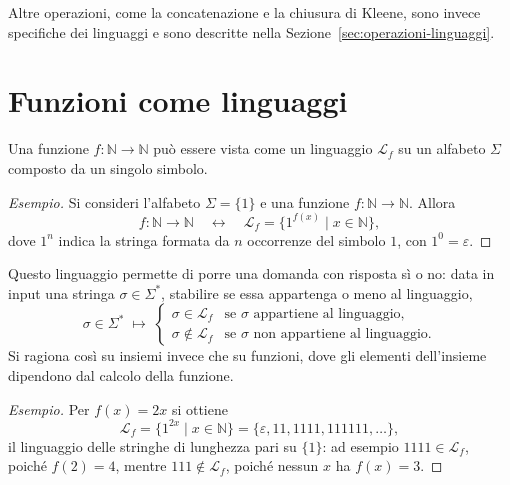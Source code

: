 \documentclass[a4paper, 11pt, oneside]{book}
\theoremstyle{formale}
\newenvironment{esempio}
    {\begin{proof}[\textit{Esempio}]\renewcommand{\qedsymbol}{$\diamond$}}
    {\end{proof}}
\begin{document}
    Altre operazioni, come la concatenazione e la chiusura di Kleene, sono invece
    specifiche dei linguaggi e sono descritte nella Sezione~\ref{sec:operazioni-linguaggi}.

    \section{Funzioni come linguaggi}
    \label{sec:funzioni-linguaggi}
    Una funzione $f \colon \mathbb{N} \to \mathbb{N}$ pu\`o essere vista come un linguaggio
    $\mathcal{L}_f$ su un alfabeto $\Sigma$ composto da un singolo simbolo.

    \begin{esempio}
        Si consideri l'alfabeto $\Sigma = \{1\}$ e una funzione
        $f \colon \mathbb{N} \to \mathbb{N}$. Allora
        \begin{equation*}
            f \colon \mathbb{N} \to \mathbb{N}
            \quad\longleftrightarrow\quad
            \mathcal{L}_f = \{1^{f(x)} \mid x \in \mathbb{N}\},
        \end{equation*}
        dove $1^n$ indica la stringa formata da $n$ occorrenze del simbolo $1$, con
        $1^0 = \varepsilon$.
    \end{esempio}

    Questo linguaggio permette di porre una domanda con risposta s\`i o no: data in input
    una stringa $\sigma \in \Sigma^*$, stabilire se essa appartenga o meno al linguaggio,
    \begin{equation*}
        \sigma \in \Sigma^*
        \;\longmapsto\;
        \begin{cases}
            \sigma \in \mathcal{L}_f & \text{se $\sigma$ appartiene al linguaggio,} \\
            \sigma \notin \mathcal{L}_f & \text{se $\sigma$ non appartiene al linguaggio.}
        \end{cases}
    \end{equation*}
    Si ragiona cos\`i su insiemi invece che su funzioni, dove gli elementi dell'insieme
    dipendono dal calcolo della funzione.

    \begin{esempio}
        Per $f(x) = 2x$ si ottiene
        \begin{equation*}
            \mathcal{L}_f = \{1^{2x} \mid x \in \mathbb{N}\}
            = \{\varepsilon, 11, 1111, 111111, \dots\},
        \end{equation*}
        il linguaggio delle stringhe di lunghezza pari su $\{1\}$: ad esempio
        $1111 \in \mathcal{L}_f$, poich\'e $f(2) = 4$, mentre $111 \notin \mathcal{L}_f$,
        poich\'e nessun $x$ ha $f(x) = 3$.
    \end{esempio}
\end{document}
